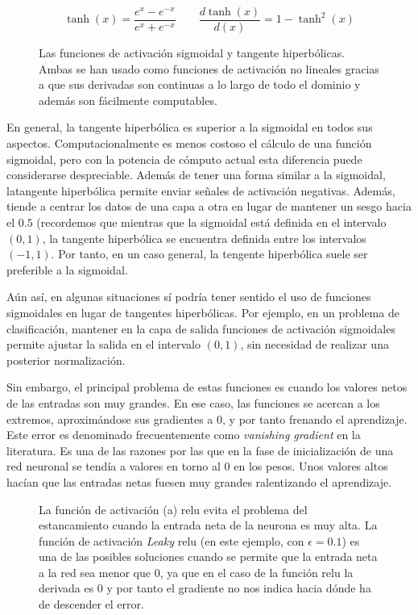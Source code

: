 \begin{equation}
	\tanh(x) = \frac{e^x - e^{-x}}{e^x+e^{-x}} \qquad
	\frac{d\tanh (x)}{d(x)} = 1 - \tanh^2(x)
	\label{eq:tanh}
\end{equation}

\begin{figure}
	\centering
	\qquad
	\caption{Las funciones de activación sigmoidal y tangente hiperbólicas. Ambas se han usado como funciones de activación no lineales gracias a que sus derivadas son continuas a lo largo de todo el dominio y además son fácilmente computables.}
	\label{fig:sig-and-tanh}
\end{figure}

En general, la tangente hiperbólica es superior a la sigmoidal en todos sus aspectos. Computacionalmente es menos costoso el cálculo de una función sigmoidal, pero con la potencia de cómputo actual esta diferencia puede considerarse despreciable. Además de tener una forma similar a la sigmoidal, latangente hiperbólica permite enviar señales de activación negativas. Además, tiende a centrar los datos de una capa a otra en lugar de mantener un sesgo hacia el $0.5$ (recordemos que mientras que la sigmoidal está definida en el intervalo $(0, 1)$, la tangente hiperbólica se encuentra definida entre los intervalos $(-1, 1)$. Por tanto, en un caso general, la tengente hiperbólica suele ser preferible a la sigmoidal.

Aún así, en algunas situaciones sí podría tener sentido el uso de funciones sigmoidales en lugar de tangentes hiperbólicas. Por ejemplo, en un problema de clasificación, mantener en la capa de salida funciones de activación sigmoidales permite ajustar la salida en el intervalo $(0, 1)$, sin necesidad de realizar una posterior normalización.

Sin embargo, el principal problema de estas funciones es cuando los valores netos de las entradas son muy grandes. En ese caso, las funciones se acercan a los extremos, aproximándose sus gradientes a 0, y por tanto frenando el aprendizaje. Este error es denominado frecuentemente como \textit{vanishing gradient} en la literatura. Es una de las razones por las que en la fase de inicialización de una red neuronal se tendía a valores en torno al 0 en los pesos. Unos valores altos hacían que las entradas netas fuesen muy grandes ralentizando el aprendizaje.

\begin{figure}
	\centering
	\qquad
	\caption{La función de activación (a) \gls{relu} evita el problema del estancamiento cuando la entrada neta de la neurona es muy alta. La función de activación \textit{Leaky} \gls{relu} (en este ejemplo, con $\epsilon = 0.1$) es una de las posibles soluciones cuando se permite que la entrada neta a la red sea menor que 0, ya que en el caso de la función \gls{relu} la derivada es 0 y por tanto el gradiente no nos indica hacia dónde ha de descender el error.}
	\label{fig:relu-and-leaky-relu}
\end{figure}

